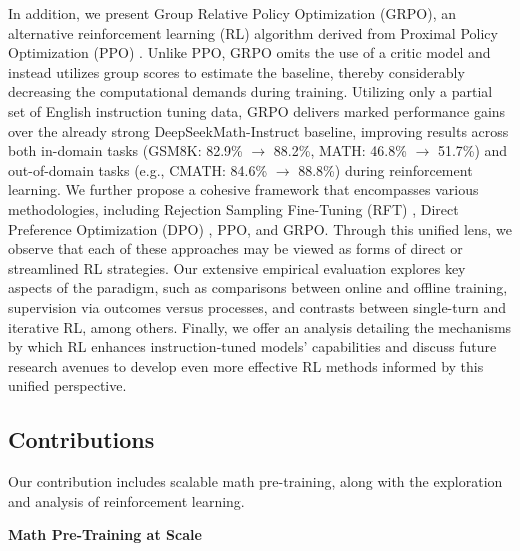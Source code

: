 In addition, we present Group Relative Policy Optimization (GRPO), an alternative reinforcement learning (RL) algorithm derived from Proximal Policy Optimization (PPO) \citep{schulman2017proximal}. Unlike PPO, GRPO omits the use of a critic model and instead utilizes group scores to estimate the baseline, thereby considerably decreasing the computational demands during training. Utilizing only a partial set of English instruction tuning data, GRPO delivers marked performance gains over the already strong DeepSeekMath-Instruct baseline, improving results across both in-domain tasks (GSM8K: 82.9\% $\rightarrow$ 88.2\%, MATH: 46.8\% $\rightarrow$ 51.7\%) and out-of-domain tasks (e.g., CMATH: 84.6\% $\rightarrow$ 88.8\%) during reinforcement learning. We further propose a cohesive framework that encompasses various methodologies, including Rejection Sampling Fine-Tuning (RFT) \citep{yuan2023scaling}, Direct Preference Optimization (DPO) \citep{dpo}, PPO, and GRPO. Through this unified lens, we observe that each of these approaches may be viewed as forms of direct or streamlined RL strategies. Our extensive empirical evaluation explores key aspects of the paradigm, such as comparisons between online and offline training, supervision via outcomes versus processes, and contrasts between single-turn and iterative RL, among others. Finally, we offer an analysis detailing the mechanisms by which RL enhances instruction-tuned models’ capabilities and discuss future research avenues to develop even more effective RL methods informed by this unified perspective.

\subsection{Contributions}
Our contribution includes scalable math pre-training, along with the exploration and analysis of reinforcement learning.

\textbf{Math Pre-Training at Scale}

